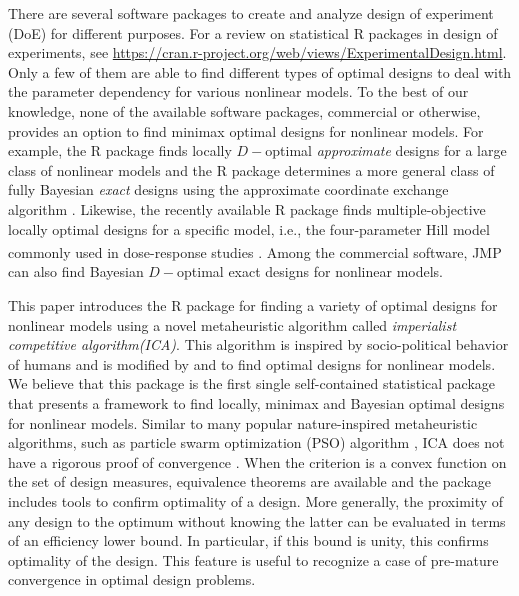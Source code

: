 There are several software packages to  create and analyze  design of experiment (DoE) for different purposes.  For a review on statistical R packages in design of experiments, see  \url{https://cran.r-project.org/web/views/ExperimentalDesign.html}.  Only a few of them are able to  find different types of optimal designs   to deal with the parameter dependency for various nonlinear models.
To the best of our knowledge, none of the available software packages, commercial or otherwise, provides an option to  find  minimax optimal designs for nonlinear models.
For example,  the R \citep{R2019} package  \citep{masoudi2013}   finds locally $D-$optimal {\it approximate} designs for a large class of nonlinear models
and the  R package \citep{overstall2017acebayes} determines a more general class of fully  Bayesian {\it exact} designs  using  the approximate coordinate exchange algorithm \citep{overstall2017bayesian}. Likewise, the recently available
 R package  finds multiple-objective locally optimal designs for a specific model, i.e., the four-parameter Hill model commonly used in dose-response studies \citep{VNM-JSS}.
Among the commercial software, JMP\textsuperscript{\textregistered} \citep{jmp13-design}  can also find Bayesian $D-$optimal exact designs for nonlinear models.

This paper introduces the R package  \citep{ICAOD2020} for finding a variety of  optimal designs for nonlinear models using  a novel metaheuristic algorithm called   {\it imperialist competitive algorithm(ICA)}.
This algorithm  is inspired by  socio-political behavior of humans \citep{ica2007, hosseini2014} and is modified by \citet{masoudi2017} and \citet{masoudi2019} to find optimal designs for nonlinear models.
We believe that this  package  is the first single self-contained statistical package  that presents  a framework to find   locally, minimax and Bayesian optimal designs for nonlinear models.
Similar to many   popular nature-inspired metaheuristic algorithms, such as particle swarm optimization (PSO) algorithm \citep{Kennedy1995},   ICA  does not have a rigorous  proof of convergence \citep{yang2011metaheuristic}.  When the criterion is a convex function on the set of design measures, equivalence theorems are available  and the  package includes tools    to confirm optimality of a design.  More generally,  the proximity of any  design to the optimum without knowing the latter can be evaluated in terms of an  efficiency lower bound. In particular, if this bound is unity, this confirms optimality of the design. This feature is  useful to  recognize a case of  pre-mature convergence in optimal design problems.



